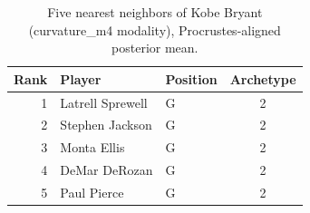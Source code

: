 \begin{table}[htbp]
  \centering\small
  \begin{tabular}{rllc}
    \toprule
    Rank & Player & Position & Archetype \\
    \midrule
    1 & Latrell Sprewell & G & 2 \\
    2 & Stephen Jackson & G & 2 \\
    3 & Monta Ellis & G & 2 \\
    4 & DeMar DeRozan & G & 2 \\
    5 & Paul Pierce & G & 2 \\
    \bottomrule
  \end{tabular}
  \caption{Five nearest neighbors of Kobe Bryant (curvature_m4 modality), Procrustes-aligned posterior mean.}
  \label{tab:Kobe_Bryant_neighbors_curvature_m4}
\end{table}

